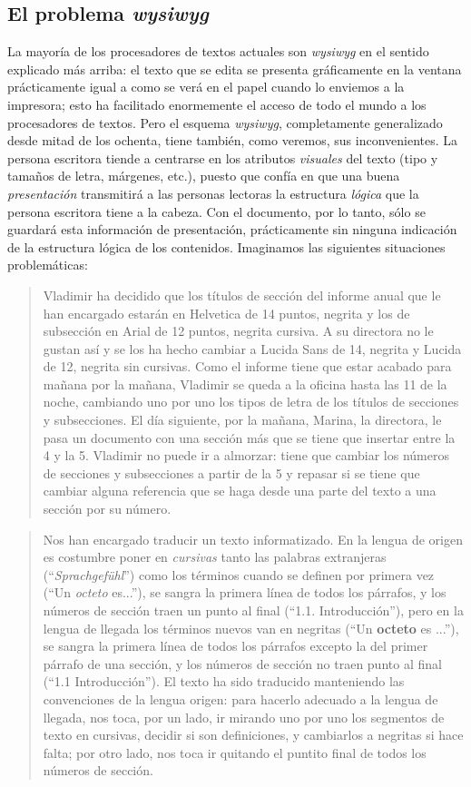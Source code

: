 {\subsection{El problema \emph{wysiwyg}}\label{s3:problema_wysiwyg} La mayoría de los procesadores de textos actuales son \emph{wysiwyg} en el sentido explicado más arriba: el texto que se edita se presenta gráficamente en la ventana prácticamente igual a como se verá en el papel cuando lo enviemos a la impresora; esto ha facilitado enormemente el acceso de todo el mundo a los procesadores de textos. Pero el esquema \emph{wysiwyg}, completamente generalizado desde mitad de los ochenta, tiene también, como veremos, sus inconvenientes. La persona escritora tiende a centrarse en los atributos \emph{visuales} del texto (tipo y tamaños de letra, márgenes, etc.), puesto que confía en que una buena \emph{presentación} transmitirá a las personas lectoras la estructura \emph{lógica} que la persona escritora tiene a la cabeza. Con el documento, por lo tanto, sólo se guardará esta información de presentación, prácticamente sin ninguna indicación de la estructura lógica de los contenidos. Imaginamos las siguientes situaciones problemáticas: \begin{quote} Vladimir ha decidido que los títulos de sección del informe anual que le han encargado estarán en Helvetica de 14 puntos, negrita y los de subsección en Arial de 12 puntos, negrita cursiva. A su directora no le gustan así y se los ha hecho cambiar a Lucida Sans de 14, negrita y Lucida de 12, negrita sin cursivas. Como el informe tiene que estar acabado para mañana por la mañana, Vladimir se queda a la oficina hasta las 11 de la noche, cambiando uno por uno los tipos de letra de los títulos de secciones y subsecciones. El día siguiente, por la mañana, Marina, la directora, le pasa un documento con una sección más que se tiene que insertar entre la 4 y la 5. Vladimir no puede ir a almorzar: tiene que cambiar los números de secciones y subsecciones a partir de la 5 y repasar si se tiene que cambiar alguna referencia que se haga desde una parte del texto a una sección por su número. \end{quote} 

\begin{quote} Nos han encargado traducir un texto informatizado. En la lengua de origen es costumbre poner en \emph{cursivas} tanto las palabras extranjeras (``\emph{Sprachgefühl}'') como los términos cuando se definen por primera vez (``Un \emph{octeto} es...''), se sangra la primera línea de todos los párrafos, y los números de sección traen un punto al final (``1.1. Introducción''), pero en la lengua de llegada los términos nuevos van en negritas (``Un \textbf{octeto} es ...''), se sangra la primera línea de todos los párrafos excepto la del primer párrafo de una sección, y los números de sección no traen punto al final (``1.1 Introducción''). El texto ha sido traducido manteniendo las convenciones de la lengua origen: para hacerlo adecuado a la lengua de llegada, nos toca, por un lado, ir mirando uno por uno los segmentos de texto en cursivas, decidir si son definiciones, y cambiarlos a negritas si hace falta; por otro lado, nos toca ir quitando el puntito final de todos los números de sección. \end{quote} 

}

